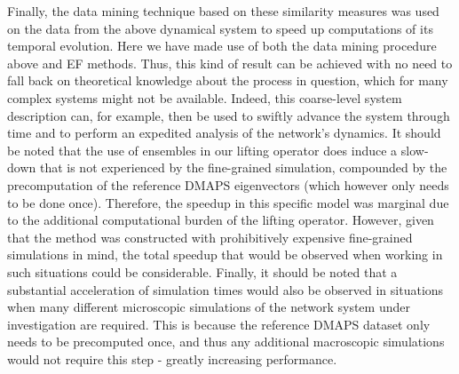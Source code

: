 Finally, the data mining technique based on these similarity measures
was used on the data from the above dynamical system to speed up
computations of its temporal evolution. Here we have made use of both
the data mining procedure above and EF methods. Thus, this kind of
result can be achieved with no need to fall back on theoretical
knowledge about the process in question, which for many complex
systems might not be available. Indeed, this coarse-level system
description can, for example, then be used to swiftly advance the
system through time and to perform an expedited analysis of the
network's dynamics. It should be noted that the use of ensembles in
our lifting operator does induce a slow-down that is not experienced
by the fine-grained simulation, compounded by the precomputation of
the reference DMAPS eigenvectors (which however only needs to be done
once). Therefore, the speedup in this specific model was marginal due
to the additional computational burden of the lifting
operator. However, given that the method was constructed with
prohibitively expensive fine-grained simulations in mind, the total
speedup that would be observed when working in such situations could
be considerable. Finally, it should be noted that a substantial
acceleration of simulation times would also be observed in situations
when many different microscopic simulations of the network system
under investigation are required. This is because the reference DMAPS
dataset only needs to be precomputed once, and thus any additional
macroscopic simulations would not require this step - greatly
increasing performance. \\

